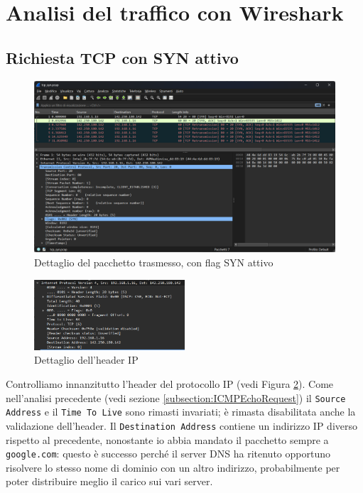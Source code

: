\documentclass[12pt,a4paper]{report}
\begin{document}
\section{Analisi del traffico con Wireshark}
\subsection{Richiesta TCP con SYN attivo}
\begin{figure}[H]
	\centering
	\includegraphics[width=1\textwidth]{tcp_syn_request}
 	\caption{Dettaglio del pacchetto trasmesso, con flag SYN attivo}
	\label{tcp_syn_request}
\end{figure}
\begin{figure}[H]
	\centering
	\includegraphics[width=0.5\textwidth]{tcp_syn_request_ip_layer}
 	\caption{Dettaglio dell'header IP}
	\label{tcp_syn_request_ip_layer}
\end{figure}
Controlliamo innanzitutto l'header del protocollo IP (vedi Figura \ref{tcp_syn_request_ip_layer}).
Come nell'analisi precedente (vedi sezione \ref{subsection:ICMPEchoRequest}) il \texttt{Source Address} e il \texttt{Time To Live} sono rimasti invariati; è rimasta disabilitata anche la validazione dell'header.
Il \texttt{Destination Address} contiene un indirizzo IP diverso rispetto al precedente, nonostante io abbia mandato il pacchetto sempre a \texttt{google.com}: questo è successo perché il server DNS ha ritenuto opportuno risolvere lo stesso nome di dominio con un altro indirizzo, probabilmente per poter distribuire meglio il carico sui vari server.
\end{document}
